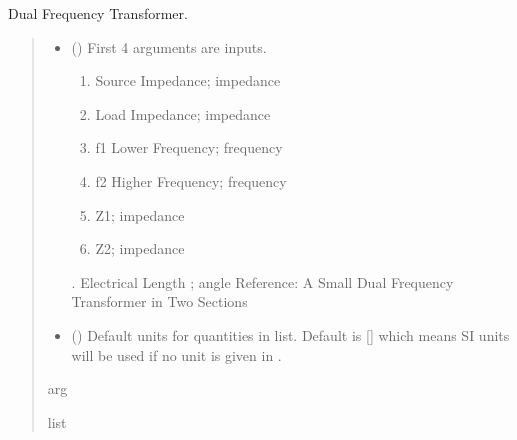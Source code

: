 \documentclass[letterpaper,10pt,english]{sphinxmanual}
\begin{document}

\begin{fulllineitems}
\label{\detokenize{components:components.DualFrequencyTransformer}}
\pysigstartsignatures
{}
\pysigstopsignatures
\sphinxAtStartPar
Dual Frequency Transformer.
\begin{quote}\begin{description}
\begin{itemize}
\item {} 
\sphinxAtStartPar
{} () \textendash{} 
\sphinxAtStartPar
First 4 arguments are inputs.
\begin{enumerate}
%
\item {} 
\sphinxAtStartPar
Source Impedance; impedance

\item {} 
\sphinxAtStartPar
Load Impedance; impedance

\item {} 
\sphinxAtStartPar
f1 Lower Frequency; frequency

\item {} 
\sphinxAtStartPar
f2 Higher Frequency; frequency

\item {} 
\sphinxAtStartPar
Z1; impedance

\item {} 
\sphinxAtStartPar
Z2; impedance

\end{enumerate}

. Electrical Length ; angle
Reference:  A Small Dual Frequency Transformer in Two Sections


\item {} 
\sphinxAtStartPar
{} (\sphinxstyleliteralemphasis{\sphinxupquote{, }}) \textendash{} Default units for quantities in  list. Default is {[}{]} which means SI units will be used if no unit is given in .

\end{itemize}

\sphinxAtStartPar
arg

\sphinxAtStartPar
list

\end{description}\end{quote}

\end{fulllineitems}
\end{document}
